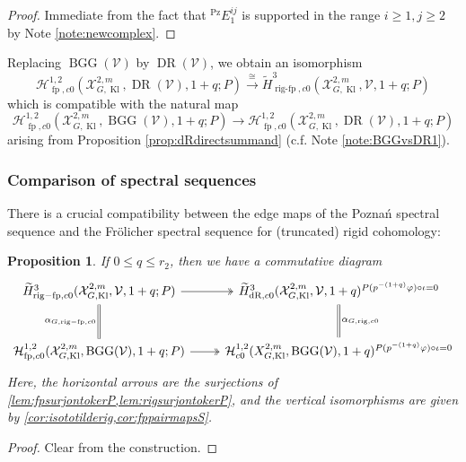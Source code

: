 \documentclass[cjm]{ipart}
\theoremstyle{plain}
\newtheorem{proposition}[theorem]{Proposition}
\theoremstyle{remark}
\DeclareMathOperator{\BGG}{BGG}
\DeclareMathOperator{\DR}{DR}
\DeclareMathOperator{\fp}{fp}
\DeclareMathOperator{\Kl}{Kl}
\DeclareMathOperator{\Pz}{Pz}
\DeclareMathOperator{\rigfp}{rig-fp}
\newcommand{\cH}{\mathcal{H}}
\newcommand{\cV}{\mathcal{V}}
\newcommand{\cX}{\mathcal{X}}
\newcommand{\dR}{\mathrm{dR}}
\newcommand{\rig}{\mathrm{rig}}
\newcommand{\wH}{\widetilde{H}}
\numberwithin{equation}{subsection}
\renewcommand{\leq}{\leqslant}
\renewcommand{\ge}{\geqslant}
\begin{document}
   \begin{proof}
    Immediate from the fact that  ${}^{\Pz}E^{ij}_1$ is supported in the range $i \ge 1, j \ge 2$ by Note \ref{note:newcomplex}.
   \end{proof}

   \begin{note}\label{note:BGGvsDR2}
    Replacing $\BGG(\cV)$ by $\DR(\cV)$, we obtain an isomorphism
    \begin{equation}
     \label{eq:fpDR}
     \cH^{1, 2}_{\fp,c0}(\cX_{G,\Kl}^{2,m}, \DR(\cV),1+q;P)   
     \xrightarrow{\,\cong\,}    
     \wH^{3}_{\rigfp, c0}(\cX_{G,\Kl}^{2,m}, \cV,1+q; P)
    \end{equation}
   which is compatible with the natural map
   \[
     \cH^{1, 2}_{\fp,c0}(\cX_{G,\Kl}^{2,m}, \BGG(\cV),1+q;P) \longrightarrow \cH^{1, 2}_{\fp,c0}(\cX_{G,\Kl}^{2,m}, \DR(\cV),1+q;P)
   \]
   arising from Proposition \ref{prop:dRdirectsummand} (c.f. Note \ref{note:BGGvsDR1}).
    \end{note}

  \subsubsection*{Comparison of spectral sequences}

   There is a crucial compatibility between the edge maps of the Pozna\'n spectral sequence and the Fr\"olicher spectral sequence for (truncated) rigid cohomology:

   \begin{proposition}\label{prop:diagfpcoh}
    If $0\leq q\leq r_2$, then we have a commutative diagram
    \[ 
    \begin{tikzcd}[row sep=large]
     \wH^{3}_{\rigfp, c0}(\cX_{G,\Kl}^{2,m}, \cV, 1+q;P)
      \arrow[r, two heads]
      \arrow[d, equal, "\alpha_{G,\rigfp, c0}" left] &
     \wH^{3}_{\dR,c0}(\cX_{G,\Kl}^{2,m},\cV, 1+q)^{P(p^{-(1+q)}\varphi) \circ \iota =0}
      \arrow[d, equal, "\alpha_{G, \rig, c0}"]\\
     \cH^{1,2}_{\fp, c0}(\cX_{G,\Kl}^{2,m}, \BGG(\cV), 1+q;P) 
      \arrow[r, two heads] & 
     \cH^{1,2}_{c0}(X_{G,\Kl}^{2,m},\BGG(\cV), 1+q)^{P(p^{-(1+q)}\varphi) \circ \iota =0}
    \end{tikzcd}
    \]
%
    Here, the horizontal arrows are the surjections of \cref{lem:fpsurjontokerP,lem:rigsurjontokerP}, and the vertical isomorphisms are given by \cref{cor:isototilderig,cor:fppairmapsS}.
   \end{proposition}
   \begin{proof}
    Clear from the construction.
   \end{proof}
\end{document}
